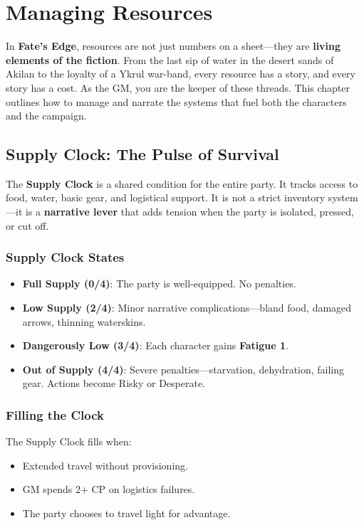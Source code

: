 \chapter{Managing Resources}

In \textbf{Fate’s Edge}, resources are not just numbers on a sheet—they are \textbf{living elements of the fiction}. From the last sip of water in the desert sands of Akilan to the loyalty of a Ykrul war-band, every resource has a story, and every story has a cost. As the GM, you are the keeper of these threads. This chapter outlines how to manage and narrate the systems that fuel both the characters and the campaign.

\section*{Supply Clock: The Pulse of Survival}

The \textbf{Supply Clock} is a shared condition for the entire party. It tracks access to food, water, basic gear, and logistical support. It is not a strict inventory system—it is a \textbf{narrative lever} that adds tension when the party is isolated, pressed, or cut off.

\subsection*{Supply Clock States}

\begin{itemize}
    \item \textbf{Full Supply (0/4)}: The party is well-equipped. No penalties.
    \item \textbf{Low Supply (2/4)}: Minor narrative complications—bland food, damaged arrows, thinning waterskins.
    \item \textbf{Dangerously Low (3/4)}: Each character gains \textbf{Fatigue 1}.
    \item \textbf{Out of Supply (4/4)}: Severe penalties—starvation, dehydration, failing gear. Actions become Risky or Desperate.
\end{itemize}

\subsection*{Filling the Clock}

The Supply Clock fills when:

\begin{itemize}
    \item Extended travel without provisioning.
    \item GM spends 2+ CP on logistics failures.
    \item The party chooses to travel light for advantage.
\end{itemize}

